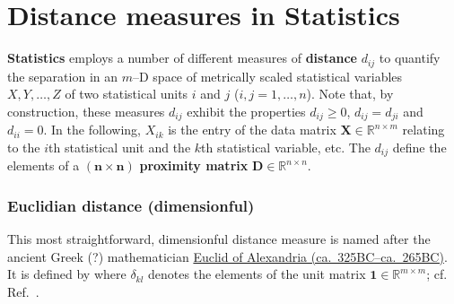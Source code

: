 \chapter[Distance measures in Statistics]{Distance measures in 
Statistics}
{\bf Statistics} employs a number of different measures of {\bf 
distance} $d_{ij}$ to quantify the separation in an $m$--D space 
of metrically scaled statistical variables $X, Y, \ldots, Z$ of
two statistical units $i$ and $j$ ($i, j = 1, \ldots, n$). Note 
that, by construction, these measures $d_{ij}$ exhibit the 
properties $d_{ij} \geq 0$, $d_{ij} = d_{ji}$ and $d_{ii} = 0$. In 
the following, $X_{ik}$ is the entry of the data matrix 
$\boldsymbol{X} \in \mathbb{R}^{n \times m}$ 
relating to the $i$th statistical unit and the $k$th statistical 
variable, etc. The $d_{ij}$ define the elements of a
$\boldsymbol{(n \times n)}$ {\bf proximity matrix} $\boldsymbol{D} 
\in \mathbb{R}^{n \times n}$.

\subsection*{Euclidian distance \hfill (dimensionful)}
This most straightforward, dimensionful distance measure is named 
after the ancient Greek (?) mathematician 
\href{http://www-history.mcs.st-and.ac.uk/Biographies/Euclid.html}{Euclid of Alexandria (ca.~325BC--ca.~265BC)}. It is defined by
%
\be
{}
\ee
%
where $\delta_{kl}$ denotes the elements of the unit matrix 
$\boldsymbol{1} \in \mathbb{R}^{m \times m}$; cf. 
Ref.~.

